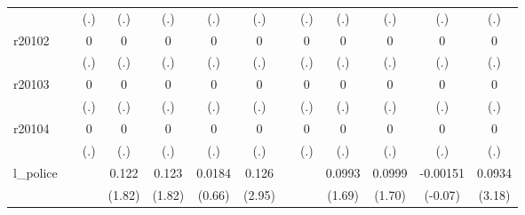 {\begin{tabular}{l*{12}{c}}
            &                     &         (.)         &         (.)         &         (.)         &         (.)         &         (.)         &                     &         (.)         &         (.)         &         (.)         &         (.)         &         (.)         \\
[1em]
r20102      &                     &           0         &           0         &           0         &           0         &           0         &                     &           0         &           0         &           0         &           0         &           0         \\
            &                     &         (.)         &         (.)         &         (.)         &         (.)         &         (.)         &                     &         (.)         &         (.)         &         (.)         &         (.)         &         (.)         \\
[1em]
r20103      &                     &           0         &           0         &           0         &           0         &           0         &                     &           0         &           0         &           0         &           0         &           0         \\
            &                     &         (.)         &         (.)         &         (.)         &         (.)         &         (.)         &                     &         (.)         &         (.)         &         (.)         &         (.)         &         (.)         \\
[1em]
r20104      &                     &           0         &           0         &           0         &           0         &           0         &                     &           0         &           0         &           0         &           0         &           0         \\
            &                     &         (.)         &         (.)         &         (.)         &         (.)         &         (.)         &                     &         (.)         &         (.)         &         (.)         &         (.)         &         (.)         \\
[1em]
l\_police    &                     &                     &       0.122         &       0.123         &      0.0184         &       0.126\sym{**} &                     &                     &      0.0993         &      0.0999         &    -0.00151         &      0.0934\sym{**} \\
            &                     &                     &      (1.82)         &      (1.82)         &      (0.66)         &      (2.95)         &                     &                     &      (1.69)         &      (1.70)         &     (-0.07)         &      (3.18)         \\

\end{tabular}}
